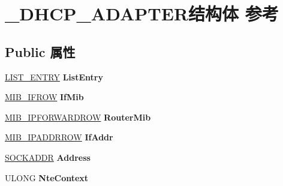 \hypertarget{struct___d_h_c_p___a_d_a_p_t_e_r}{}\section{\+\_\+\+D\+H\+C\+P\+\_\+\+A\+D\+A\+P\+T\+E\+R结构体 参考}
\label{struct___d_h_c_p___a_d_a_p_t_e_r}
\subsection*{Public 属性}
\begin{DoxyCompactItemize}
\item 
\mbox{\label{struct___d_h_c_p___a_d_a_p_t_e_r_aa0d040ff34638f4593a06c11ee1edaa9}} 
\hyperlink{struct___l_i_s_t___e_n_t_r_y}{L\+I\+S\+T\+\_\+\+E\+N\+T\+RY} {\bfseries List\+Entry}
\item 
\mbox{\label{struct___d_h_c_p___a_d_a_p_t_e_r_ade34b16d2e588473bf0be5266e06b0a1}} 
\hyperlink{struct___m_i_b___i_f_r_o_w}{M\+I\+B\+\_\+\+I\+F\+R\+OW} {\bfseries If\+Mib}
\item 
\mbox{\label{struct___d_h_c_p___a_d_a_p_t_e_r_a15e4408cef595569713d139747b7c1fe}} 
\hyperlink{struct___m_i_b___i_p_f_o_r_w_a_r_d_r_o_w}{M\+I\+B\+\_\+\+I\+P\+F\+O\+R\+W\+A\+R\+D\+R\+OW} {\bfseries Router\+Mib}
\item 
\mbox{\label{struct___d_h_c_p___a_d_a_p_t_e_r_a2ed5f398a8a1d122db9853d056c0fa76}} 
\hyperlink{struct___m_i_b___i_p_a_d_d_r_r_o_w}{M\+I\+B\+\_\+\+I\+P\+A\+D\+D\+R\+R\+OW} {\bfseries If\+Addr}
\item 
\mbox{\label{struct___d_h_c_p___a_d_a_p_t_e_r_a7bad48b9d068a341cc896112bc0338ef}} 
\hyperlink{structsockaddr}{S\+O\+C\+K\+A\+D\+DR} {\bfseries Address}
\item 
\mbox{\label{struct___d_h_c_p___a_d_a_p_t_e_r_a0fdd5a2cebf0989a6bd195d108085501}} 
U\+L\+O\+NG {\bfseries Nte\+Context}
\item 
\mbox{\label{struct___d_h_c_p___a_d_a_p_t_e_r_a1423eeaab9654e6f59564e3a1e81aee4}} 

\end{DoxyCompactItemize}
